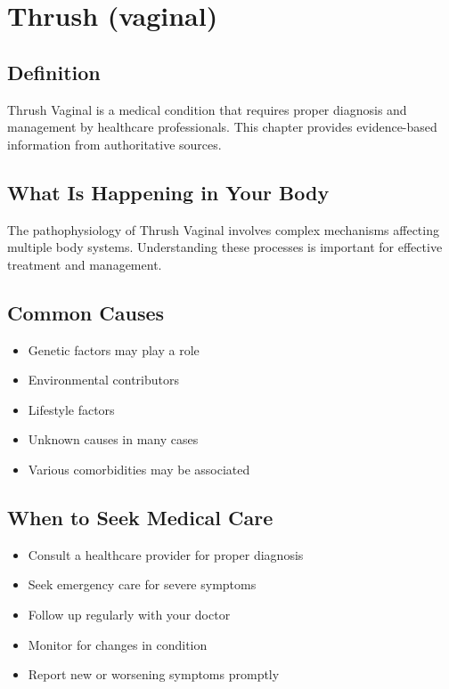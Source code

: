 
\chapter{Thrush (vaginal)}

\section*{Definition}
Thrush Vaginal is a medical condition that requires proper diagnosis and management by healthcare professionals. This chapter provides evidence-based information from authoritative sources.

\section*{What Is Happening in Your Body}
The pathophysiology of Thrush Vaginal involves complex mechanisms affecting multiple body systems. Understanding these processes is important for effective treatment and management.

\section*{Common Causes}
\begin{itemize}
  \item Genetic factors may play a role
  \item Environmental contributors
  \item Lifestyle factors
  \item Unknown causes in many cases
  \item Various comorbidities may be associated
\end{itemize}

\section*{When to Seek Medical Care}
\begin{itemize}
  \item Consult a healthcare provider for proper diagnosis
  \item Seek emergency care for severe symptoms
  \item Follow up regularly with your doctor
  \item Monitor for changes in condition
  \item Report new or worsening symptoms promptly
\end{itemize}

